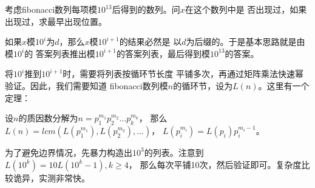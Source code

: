 \begin{prob}
	考虑fibonacci数列每项模$10^{13}$后得到的数列。问$x$在这个数列中是
	否出现过，如果出现过，求最早出现位置。
\end{prob}

\begin{sol}
	如果$x$模$10^i$为$d$，那么$x$模$10^{i+1}$的结果必然是
	以$d$为后缀的。于是基本思路就是由模$10^i$的
	答案列表推出模$10^{i+1}$的答案列表，最后得到模$10^{13}$的答案。
	
	\par 将$10^i$推到$10^{i+1}$时，需要将列表按循环节长度
	平铺多次，再通过矩阵乘法快速幂验证。因此，我们需要知道
	fibonacci数列模$n$的循环节，设为$L(n)$。这里有一个定理：\par
	设$n$的质因数分解为$n = p_1^{m_1} p_2^{m_2} \ldots p_k^{m_k}$，
	那么$L(n)=lcm(L(p_1^{m_1}), L(p_2^{m_2}), \ldots)$，
	$L(p_i^{m_i}) = L(p_i)p_i^{m_{i}-1}$。
	\par
	为了避免边界情况，先暴力构造出$10^3$的列表。注意到$L(10^k)=10L(10^k-1), k \ge 4$，
	那么每次平铺10次，然后验证即可。复杂度比较诡异，实测非常快。
\end{sol}
